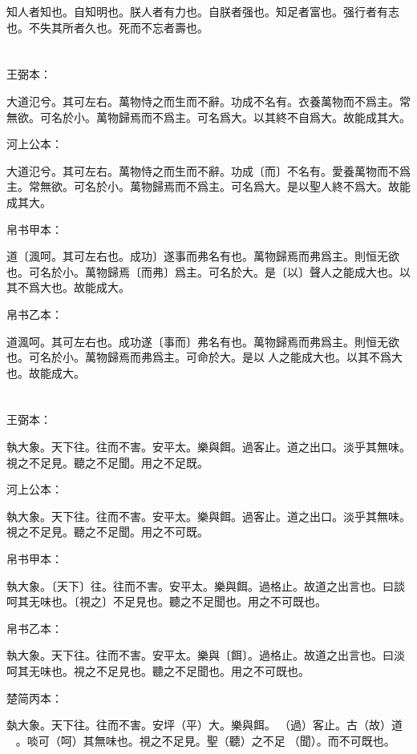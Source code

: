 \documentclass[a5paper]{ctexbook}
\begin{document}
    知人者知也。自知明也。朕人者有力也。自朕者强也。知足者富也。强行者有志也。不失其所者久也。死而不忘者壽也。

    \chapter{}
    王弼本：

    大道氾兮。其可左右。萬物恃之而生而不辭。功成不名有。衣養萬物而不爲主。常無欲。可名於小。萬物歸焉而不爲主。可名爲大。以其終不自爲大。故能成其大。

    河上公本：

    大道氾兮。其可左右。萬物恃之而生而不辭。功成〔而〕不名有。愛養萬物而不爲主。常無欲。可名於小。萬物歸焉而不爲主。可名爲大。是以聖人終不爲大。故能成其大。

    帛书甲本：

    道〔渢呵。其可左右也。成功〕遂事而弗名有也。萬物歸焉而弗爲主。則恒无欲也。可名於小。萬物歸焉〔而弗〕爲主。可名於大。是〔以〕聲人之能成大也。以其不爲大也。故能成大。

    帛书乙本：

    道渢呵。其可左右也。成功遂〔事而〕弗名有也。萬物歸焉而弗爲主。則恒无欲也。可名於小。萬物歸焉而弗爲主。可命於大。是以𦔻人之能成大也。以其不爲大也。故能成大。

    \chapter{}
    王弼本：

    執大象。天下往。往而不害。安平太。樂與餌。過客止。道之出口。淡乎其無味。視之不足見。聽之不足聞。用之不足既。

    河上公本：

    執大象。天下往。往而不害。安平太。樂與餌。過客止。道之出口。淡乎其無味。視之不足見。聽之不足聞。用之不可既。

    帛书甲本：

    執大象。〔天下〕往。往而不害。安平太。樂與餌。過格止。故道之出言也。曰談呵其无味也。〔視之〕不足見也。聽之不足聞也。用之不可既也。

    帛书乙本：

    執大象。天下往。往而不害。安平太。樂與〔餌〕。過格止。故道之出言也。曰淡呵其无味也。視之不足見也。聽之不足聞也。用之不可既也。

    楚简丙本：

    埶大象。天下往。往而不害。安坪（平）大。樂與餌。󶵨（過）客止。古（故）道☐☐☐。啖可（呵）其無味也。視之不足見。聖（聽）之不足𦖞（聞）。而不可既也。
\end{document}
